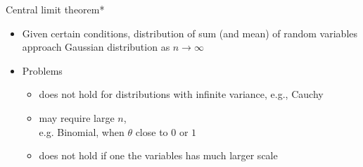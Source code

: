 \documentclass[english,t]{beamer}
\begin{document}
\begin{frame}{Central limit theorem*}

  \begin{itemize}
  \item Given certain conditions, distribution of sum (and mean) of
    random variables approach Gaussian distribution as
    $n \rightarrow \infty$
  \item<2-> Problems
    \begin{itemize}
    \item<2-> does not hold for distributions with infinite variance,
      e.g., Cauchy
    \item<3-> may require large $n$,\\ e.g.
      Binomial, when $\theta$ close to $0$ or $1$
    \item<4-> does not hold if one the variables has much larger scale
    \end{itemize}
  \end{itemize}

\end{frame}


\end{document}
